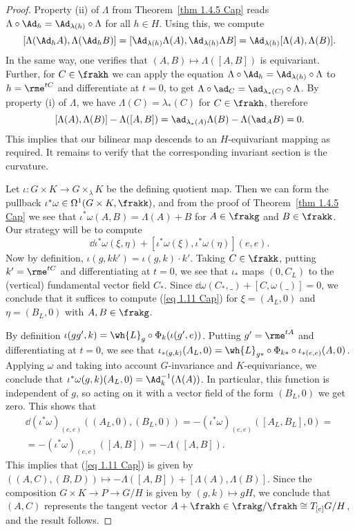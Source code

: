 \begin{proof}
    Property (ii) of $\Lambda$ from Theorem~\ref{thm 1.4.5 Cap} reads $\Lambda\circ\Ad_h=\Ad_{\lambda(h)}\circ\Lambda$ for all $h\in H$. Using this, we compute 
    \[[\Lambda(\Ad_h A),\Lambda(\Ad_h B)]=[\Ad_{\lambda(h)}\Lambda(A),\Ad_{\lambda(h)}\Lambda B]=\Ad_{\lambda(h)}[\Lambda(A),\Lambda(B)].\]
    In the same way, one verifies that $(A,B)\mapsto \Lambda([A,B])$ is equivariant. Further, for $C\in\frakh$ we can apply the equation $\Lambda\circ \Ad_h=\Ad_{\lambda(h)}\circ \Lambda$ to $h=\rme^{tC}$ and differentiate at $t=0$, to get $\Lambda\circ\ad_C=\ad_{\lambda_\ast(C)}\circ\Lambda$. By property (i) of $\Lambda$, we have $\Lambda(C)=\lambda_\ast(C)$ for $C\in\frakh$, therefore 
    \[[\Lambda(A),\Lambda(B)]-\Lambda([A,B])=\ad_{\lambda_\ast(A)}\Lambda(B)-\Lambda(\ad_A B)=0.\]
    This implies that our bilinear map descends to an $H$-equivariant mapping as required. It remains to verify that the corresponding invariant section is the curvature.

    Let $\iota:G\times K\to G\times_\lambda K$ be the defining quotient map. Then we can form the pullback $\iota^\ast\omega\in\Omega^1(G\times K,\frakk)$, and from the proof of Theorem~\ref{thm 1.4.5 Cap} we see that $\iota^\ast\omega(A,B)=\Lambda(A)+B$ for $A\in\frakg$ and $B\in\frakk$. Our strategy will be to compute 
    \[\dd\iota^\ast\omega(\xi,\eta)+[\iota^\ast\omega(\xi),\iota^\ast\omega(\eta)](e,e).\label{eq 1.11 Cap}\]
    Now by definition, $\iota(g,kk')=\iota(g,k)\cdot k'$. Taking $C\in\frakk$, putting $k'=\rme^{tC}$ and differentiating at $t=0$, we see that $\iota_\ast$ maps $(0,C_L)$ to the (vertical) fundamental vector field $C_\ast$. Since $\dd\omega(C_\ast,\_)+[C,\omega(\_)]=0$, we conclude that it suffices to compute (\ref{eq 1.11 Cap}) for $\xi=(A_L,0)$ and $\eta=(B_L,0)$ with $A,B\in\frakg$.

    By definition $\iota(gg',k)=\wh{L}_g\circ \Phi_k(\iota(g',e))$. Putting $g'=\rme^{tA}$ and differentiating at $t=0$, we see that $\iota_{\ast(g,k)}(A_L,0)=\wh{L}_{g\ast}\circ \Phi_{k\ast}\circ \iota_{\ast(e,e)}(A,0)$. Applying $\omega$ and taking into account $G$-invariance and $K$-equivariance, we conclude that $\iota^\ast\omega(g,k)(A_L,0)=\Ad_k^{-1}(\Lambda(A))$. In particular, this function is independent of $g$, so acting on it with a vector field of the form $(B_L,0)$ we get zero. This shows that
    \begin{multline}
        \dd(\iota^\ast\omega)_{(e,e)}((A_L,0),(B_L,0))=-(\iota^\ast\omega)_{(e,e)}([A_L,B_L],0)=\\
        =-(\iota^\ast \omega)_{(e,e)}([A,B])=-\Lambda([A,B]).
    \end{multline}
    This implies that (\ref{eq 1.11 Cap}) is given by $((A,C),(B,D))\mapsto -\Lambda([A,B])+[\Lambda(A),\Lambda(B)]$. Since the composition $G\times K\to P\to G\slash H$ is given by $(g,k)\mapsto gH$, we conclude that $(A,C)$ represents the tangent vector $A+\frakh\in\frakg\slash\frakh\cong T_{[e]}G\slash H$, and the result follows.
\end{proof}

